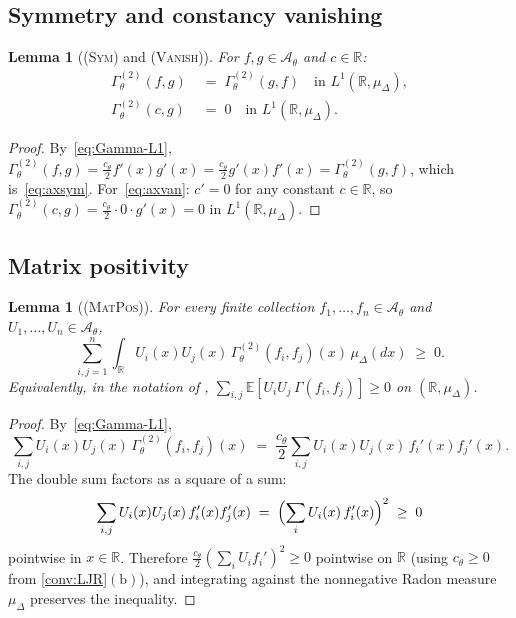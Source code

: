 \documentclass[11pt,reqno]{amsart}
\theoremstyle{plain}
\newtheorem{lemma}[theorem]{Lemma}
\theoremstyle{definition}
\theoremstyle{remark}
\newcommand{\R}{\mathbb{R}}
\newcommand{\E}{\mathbb{E}}
\newcommand{\cA}{\mathcal A}
\begin{document}
\subsection{Symmetry and constancy vanishing}\label{sec:axioms-symvan}

\begin{lemma}[\normalfont\textsc{(Sym)} and \normalfont\textsc{(Vanish)}]\label{lem:symvan}
For $f,g\in\cA_{\theta}$ and $c\in\R$:
\begin{align}
  \Gamma^{(2)}_{\theta}(f,g) &\;=\;\Gamma^{(2)}_{\theta}(g,f)
  \quad\text{in }L^{1}(\R,\mu_{\Delta}),\label{eq:axsym}\\
  \Gamma^{(2)}_{\theta}(c,g) &\;=\;0
  \quad\text{in }L^{1}(\R,\mu_{\Delta}).\label{eq:axvan}
\end{align}
\end{lemma}

\begin{proof}
By~\eqref{eq:Gamma-L1},
$\Gamma^{(2)}_{\theta}(f,g)=\frac{c_{\theta}}{2}f'(x)g'(x)
=\frac{c_{\theta}}{2}g'(x)f'(x)=\Gamma^{(2)}_{\theta}(g,f)$,
which is~\eqref{eq:axsym}. For~\eqref{eq:axvan}: $c'=0$ for any
constant $c\in\R$, so
$\Gamma^{(2)}_{\theta}(c,g)=\frac{c_{\theta}}{2}\cdot 0\cdot g'(x)=0$
in $L^{1}(\R,\mu_{\Delta})$.
\end{proof}

\subsection{Matrix positivity}\label{sec:axioms-matpos}

\begin{lemma}[\normalfont\textsc{(MatPos)}]\label{lem:matpos}
For every finite collection $f_{1},\ldots,f_{n}\in\cA_{\theta}$
and $U_{1},\ldots,U_{n}\in\cA_{\theta}$,
\begin{equation}\label{eq:axmatpos}
  \sum_{i,j=1}^{n}\!\int_{\R}U_{i}(x)U_{j}(x)\,\Gamma^{(2)}_{\theta}(f_{i},f_{j})(x)\,\mu_{\Delta}(dx)\;\ge\;0.
\end{equation}
Equivalently, in the notation of
\cite[Eq.~(2.3)]{GammaHierarchyDivergence},
$\sum_{i,j}\E[U_{i}U_{j}\,\Gamma(f_{i},f_{j})]\ge 0$ on
$(\R,\mu_{\Delta})$.
\end{lemma}

\begin{proof}
By~\eqref{eq:Gamma-L1},
\[
  \sum_{i,j}U_{i}(x)U_{j}(x)\,\Gamma^{(2)}_{\theta}(f_{i},f_{j})(x)
  \;=\;\frac{c_{\theta}}{2}\sum_{i,j}U_{i}(x)U_{j}(x)\,f_{i}'(x)f_{j}'(x).
\]
The double sum factors as a square of a sum:
\begin{equation}\label{eq:square-of-sum}
  \sum_{i,j}U_{i}(x)U_{j}(x)\,f_{i}'(x)f_{j}'(x)
  \;=\;\Bigl(\sum_{i}U_{i}(x)\,f_{i}'(x)\Bigr)^{2}
  \;\ge\;0
\end{equation}
pointwise in $x\in\R$. Therefore
$\frac{c_{\theta}}{2}(\sum_{i}U_{i}f_{i}')^{2}\ge 0$ pointwise
on $\R$ (using $c_{\theta}\ge 0$ from \cref{conv:LJR}$(\mathrm b)$),
and integrating against the nonnegative Radon measure
$\mu_{\Delta}$ preserves the inequality.
\end{proof}
\end{document}
